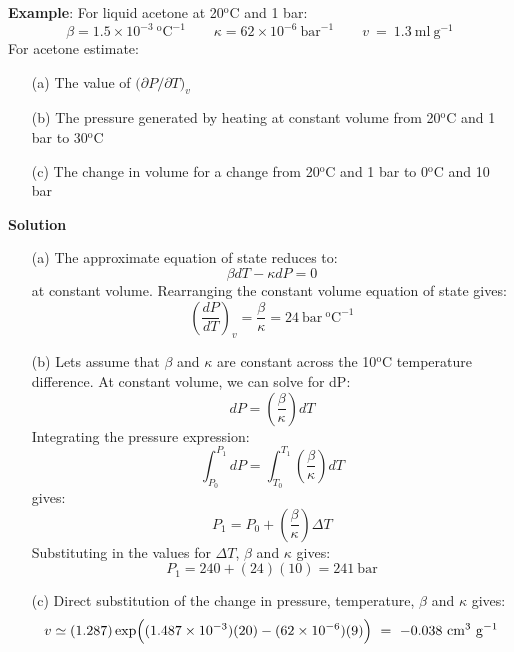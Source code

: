 \documentclass[11pt]{article}
\theoremstyle{definition}
\begin{document}
\begin{mdframed}[backgroundcolor=lgray]
  \noindent\textbf{Example}: For liquid acetone at 20$^{\mathrm{o}}$C and 1 bar:
  \begin{equation*}
    \beta = 1.5\times10^{-3}~^{\mathrm{o}}\mathrm{C}^{\mathrm{-1}}\qquad\kappa=62\times10^{-6}~\mathrm{bar}^{-1}\qquad v~=~1.3~\mathrm{ml~g^{-1}}
  \end{equation*}
  For acetone estimate:
  \begin{enumerate}
    \item[(a)]{The value of $\Bigr(\partial{P}/\partial{T}\Bigr)_{v}$}
    \item[(b)]{The pressure generated by heating at constant volume from 20$^{\mathrm{o}}$C and 1 bar to 30$^{\mathrm{o}}$C}
    \item[(c)]{The change in volume for a change from 20$^{\mathrm{o}}$C and 1 bar to 0$^{\mathrm{o}}$C and 10 bar}
  \end{enumerate}
	\noindent\textbf{Solution}
	\begin{enumerate}
		\item[(a)]{The approximate equation of state reduces to:
		\begin{equation}
			\beta dT -\kappa dP = 0
		\end{equation}
		at constant volume. Rearranging the constant volume equation of state gives:
		\begin{equation}
			\left(\frac{dP}{dT}\right)_{v} = \frac{\beta}{\kappa} = 24~\mathrm{bar~^{o}C^{-1}}
		\end{equation}
		}
		\item[(b)]{Lets assume that $\beta$ and $\kappa$ are constant across the 10$^{\mathrm{o}}$C temperature difference.
		At constant volume, we can solve for dP:
		\begin{equation}
			dP = \left(\frac{\beta}{\kappa}\right)dT
		\end{equation}Integrating the pressure expression:
		\begin{equation}
			\int_{P_{0}}^{P_{1}}dP = \int_{T_{0}}^{T_{1}}\left(\frac{\beta}{\kappa}\right)dT
		\end{equation}gives:
		\begin{equation}
			P_{1} = P_{0}+\left(\frac{\beta}{\kappa}\right)\Delta{T}
		\end{equation}Substituting in the values for $\Delta{T}$, $\beta$ and $\kappa$ gives:
		\begin{equation}
			P_{1} = 240 + (24)(10) = 241~\mathrm{bar}
		\end{equation}
		}
		\item[(c)]{Direct substitution of the change in pressure, temperature, $\beta$ and $\kappa$ gives:
		\begin{equation}
			v\simeq(1.287)\exp\Bigl((1.487\times10^{-3})(20)-(62\times10^{-6})(9)\Bigr)~=~-0.038~\mathrm{cm^{3}~g^{-1}}
		\end{equation}
		}
	\end{enumerate}

\end{mdframed}
\end{document}

